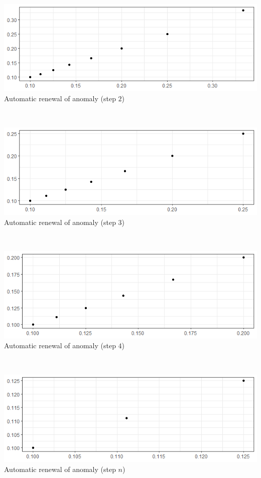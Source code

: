 \documentclass[20pt,landscape,footrule,headrule]{foils}
\begin{document}
\newpage\ \\ 
\begin{center}
\includegraphics[width=\textwidth]{Images/ADOA2.png}\\ Automatic renewal of anomaly (step $2$)
\end{center}
\newpage\ \\ 
\begin{center}
\includegraphics[width=\textwidth]{Images/ADOA3.png}\\ Automatic renewal of anomaly (step $3$)
\end{center}
\newpage\ \\ 
\begin{center}
\includegraphics[width=\textwidth]{Images/ADOA4.png} \\ Automatic renewal of anomaly (step $4$)
\end{center}
\newpage\ \\ 
\begin{center}
\includegraphics[width=\textwidth]{Images/ADOAn.png}\\ Automatic renewal of anomaly (step $n$)
\end{center}
\end{document}

